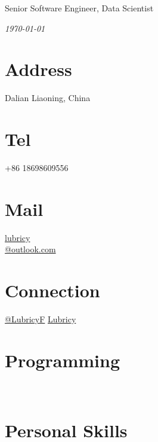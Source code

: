 \documentclass[]{friggeri-cv}
\begin{document}
      {Senior Software Engineer, Data Scientist}
\begin{flushright}
\emph{\today}
\end{flushright}
           

\begin{aside}
  \section{Address}
    Dalian
    Liaoning, China
    ~
  \section{Tel}
    \faMobile+86 18698609556
    ~
  \section{Mail}
    \faEnvelopeO\href{mailto:lubricy@outlook.com}{ lubricy\\@outlook.com}
    ~
  \section{Connection}
    \faTwitter\href{https://twitter.com/LubricyF}{@LubricyF}
    \faGithub\href{https://github.com/Lubricy}{Lubricy}
    ~
  \section{Programming}
    ~
  \section{Personal Skills}
    ~

\end{aside}
\end{document}
